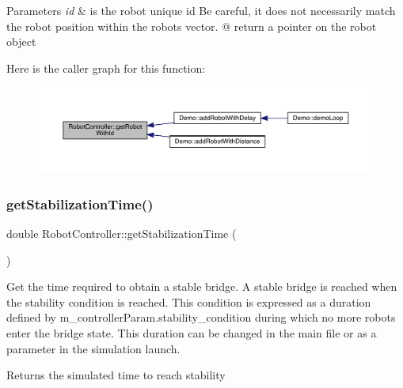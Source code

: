 \begin{DoxyParams}{Parameters}
{\em id} & is the robot unique id Be careful, it does not necessarily match the robot position within the robots\textquotesingle{} vector. @ return a pointer on the robot object \\
\hline
\end{DoxyParams}
Here is the caller graph for this function\+:\nopagebreak
\begin{figure}[H]
\begin{center}
\leavevmode
\includegraphics[width=350pt]{class_robot_controller_aa247b8c90ab585358f07a18c891c8b31_icgraph}
\end{center}
\end{figure}
\mbox{\label{class_robot_controller_acd0a73a62eca471d77a42a0c15964b8e}} 
\subsubsection{\texorpdfstring{get\+Stabilization\+Time()}{getStabilizationTime()}}
{\footnotesize\ttfamily double Robot\+Controller\+::get\+Stabilization\+Time (\begin{DoxyParamCaption}{ }\end{DoxyParamCaption})}

Get the time required to obtain a stable bridge. A stable bridge is reached when the stability condition is reached. This condition is expressed as a duration defined by m\+\_\+controller\+Param.\+stability\+\_\+condition during which no more robots enter the bridge state. This duration can be changed in the main file or as a parameter in the simulation launch. \begin{DoxyReturn}{Returns}
the simulated time to reach stability 
\end{DoxyReturn}
\mbox{\label{class_robot_controller_a3191cad0cf82d3378aec0512baf2722b}} 
